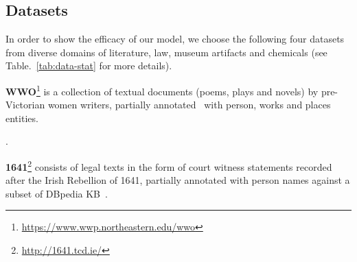 \documentclass[11pt]{article}
\newcommand{\td}[1]{\textcolor{blue}{[{SP: #1}]}}
\begin{document}
\subsection{Datasets}
In order to show the efficacy of our model, we choose the following four datasets from diverse domains of literature, law, museum artifacts and chemicals (see Table.~\ref{tab:data-stat} for more details). 

\noindent
\textbf{WWO}\footnote{\url{https://www.wwp.northeastern.edu/wwo}} is a collection of textual documents (poems, plays and novels) by pre-Victorian women writers, partially
annotated~\cite{flanders2010encoding} with person, works and places entities. 

\begin{table}
\caption{\label{tab:data-stat}Data statistics of the four used datasets: Total number of Documents ($\#D$), Total number of mentions ($\#M$), Number of Nodes ($\#N$) and Edges ($\#E$) in KG, Average number of candidates per mention ($\#C$) and Recall of the candidate entities i.e fraction of mentions with gold entities present among the candidates ($\#R$)}.
\end{table}

\noindent
\textbf{1641}\footnote{\url{http://1641.tcd.ie/}} consists of legal texts in the form of court witness statements recorded after the Irish Rebellion of 1641, partially
annotated with person names against a subset of DBpedia KB~\cite{klie2020zero}. 
\end{document}
